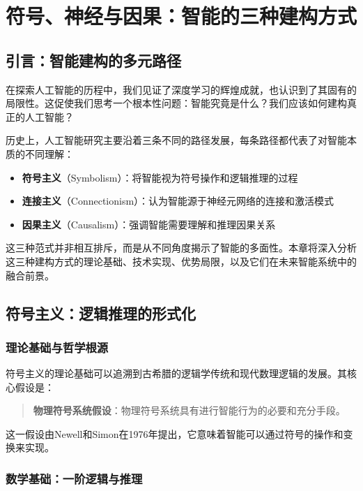 \chapter{符号、神经与因果：智能的三种建构方式}

\section{引言：智能建构的多元路径}

在探索人工智能的历程中，我们见证了深度学习的辉煌成就，也认识到了其固有的局限性。这促使我们思考一个根本性问题：智能究竟是什么？我们应该如何建构真正的人工智能？

历史上，人工智能研究主要沿着三条不同的路径发展，每条路径都代表了对智能本质的不同理解：

\begin{itemize}
\item \textbf{符号主义}（Symbolism）：将智能视为符号操作和逻辑推理的过程
\item \textbf{连接主义}（Connectionism）：认为智能源于神经元网络的连接和激活模式
\item \textbf{因果主义}（Causalism）：强调智能需要理解和推理因果关系
\end{itemize}

这三种范式并非相互排斥，而是从不同角度揭示了智能的多面性。本章将深入分析这三种建构方式的理论基础、技术实现、优势局限，以及它们在未来智能系统中的融合前景。

\section{符号主义：逻辑推理的形式化}

\subsection{理论基础与哲学根源}

符号主义的理论基础可以追溯到古希腊的逻辑学传统和现代数理逻辑的发展。其核心假设是：

\begin{quote}
\textbf{物理符号系统假设}：物理符号系统具有进行智能行为的必要和充分手段。
\end{quote}

这一假设由Newell和Simon在1976年提出，它意味着智能可以通过符号的操作和变换来实现。

\subsection{数学基础：一阶逻辑与推理}

